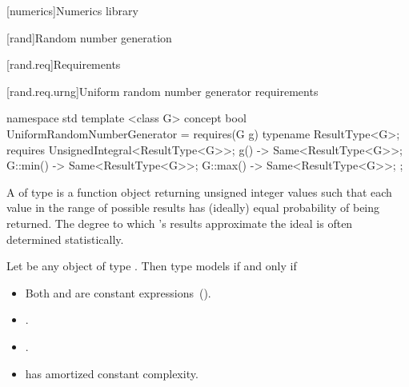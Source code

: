[numerics]{Numerics library}

\setcounter{section}{4}
[rand]{Random number generation}

[rand.req]{Requirements}


\setcounter{subsubsection}{2}
[rand.req.urng]{Uniform random number generator requirements}%
%

\color{newclr}
\begin{codeblock}
namespace std {
  template <class G>
  concept bool UniformRandomNumberGenerator =
    requires(G g) {
      typename ResultType<G>;
      requires UnsignedIntegral<ResultType<G>>;
      { g() } -> Same<ResultType<G>>;
      { G::min() } -> Same<ResultType<G>>;
      { G::max() } -> Same<ResultType<G>>;
    };
}
\end{codeblock}
\color{black}

\pnum
A 
 of type 
is a function object
returning unsigned integer values
such that each value
in the range of possible results
has (ideally) equal probability
of being returned.
\enternote
 The degree to which 's results
 approximate the ideal
 is often determined statistically.
\exitnote


\color{newclr}
\pnum
Let  be any object of type . Then type  models
 if and only if

\begin{itemize}
\item Both  and  are constant expressions~().
\item {}.
\item {}.
\item {} has amortized constant complexity.
\end{itemize}

\color{black}
